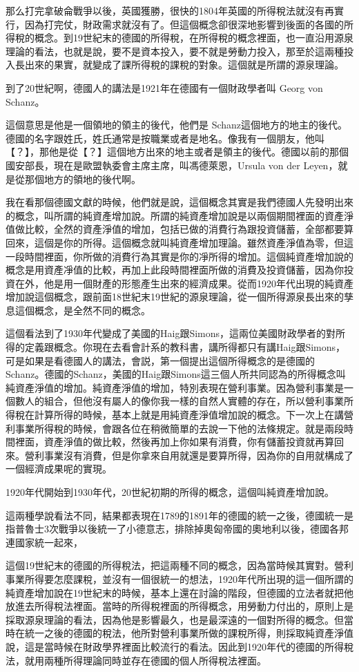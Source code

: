 \documentclass[]{ctexbook}
\begin{document}
那么打完拿破侖戰爭以後，英國獲勝，很快的1804年英國的所得稅法就沒有再實行，因為打完仗，財政需求就沒有了。但這個概念卻很深地影響到後面的各國的所得稅的概念。到19世紀末的德國的所得稅，在所得稅的概念裡面，也一直沿用源泉理論的看法，也就是說，要不是資本投入，要不就是勞動力投入，那至於這兩種投入長出來的果實，就變成了課所得稅的課稅的對象。這個就是所謂的源泉理論。

到了20世紀啊，德國人的講法是1921年在德國有一個財政學者叫 Georg von Schanz。

這個意思是他是一個領地的領主的後代，他們是 Schanz這個地方的地主的後代。德國的名字跟姓氏，姓氏通常是按職業或者是地名。像我有一個朋友，他叫【？】，那他是從【？】這個地方出來的地主或者是領主的後代。德國以前的那個國安部長，現在是歐盟執委會主席主席，叫馮德萊恩，Ursula von der Leyen，就是從那個地方的領地的後代啊。

我在看那個德國文獻的時候，他們就是說，這個概念其實是我們德國人先發明出來的概念，叫所謂的純資產增加說。所謂的純資產增加說是以兩個期間裡面的資產淨值做比較，全然的資產淨值的增加，包括已做的消費行為跟投資儲蓄，全部都要算回來，這個是你的所得。這個概念就叫純資產增加理論。雖然資產淨值為零，但這一段時間裡面，你所做的消費行為其實是你的凈所得的增加。這個純資產增加說的概念是用資產凈值的比較，再加上此段時間裡面所做的消費及投資儲蓄，因為你投資在外，他是用一個財產的形態產生出來的經濟成果。從而1920年代出現的純資產增加說這個概念，跟前面18世紀末19世紀的源泉理論，從一個所得源泉長出來的孳息這個概念，是全然不同的概念。

這個看法到了1930年代變成了美國的Haig跟Simons，這兩位美國財政學者的對所得的定義跟概念。你現在去看會計系的教科書，講所得都只有講Haig跟Simons，可是如果是看德國人的講法，會説，第一個提出這個所得概念的是德國的Schanz。德國的Schanz，美國的Haig跟Simons這三個人所共同認為的所得概念叫純資產淨值的增加。純資產淨值的增加，特別表現在營利事業。因為營利事業是一個數人的組合，但他沒有屬人的像你我一樣的自然人實體的存在，所以營利事業所得稅在計算所得的時候，基本上就是用純資產淨值增加說的概念。下一次上在講營利事業所得稅的時候，會跟各位在稍微簡單的去說一下他的法條規定。就是兩段時間裡面，資產淨值的做比較，然後再加上你如果有消費，你有儲蓄投資就再算回來。營利事業沒有消費，但是你拿來自用就還是要算所得，因為你的自用就構成了一個經濟成果呢的實現。

1920年代開始到1930年代，20世紀初期的所得的概念，這個叫純資產增加說。

這兩種學說看法不同，結果都表現在1789的1891年的德國的統一之後，德國統一是指普魯士3次戰爭以後統一了小德意志，排除掉奧匈帝國的奧地利以後，德國各邦連國家統一起來，

這個19世紀末的德國的所得稅法，把這兩種不同的概念，因為當時候其實對。營利事業所得要怎麼課稅，並沒有一個很統一的想法，1920年代所出現的這一個所謂的純資產增加說在19世紀末的時候，基本上還在討論的階段，但德國的立法者就把他放進去所得稅法裡面。當時的所得稅裡面的所得概念，用勞動力付出的，原則上是採取源泉理論的看法，因為他是影響最久，也是最深遠的一個對所得的概念。但當時在統一之後的德國的稅法，他所對營利事業所做的課稅所得，則採取純資產淨值說，這是當時候在財政學界裡面比較流行的看法。因此到1920年代的德國的所得稅法，就用兩種所得理論同時並存在德國的個人所得稅法裡面。
\end{document}
